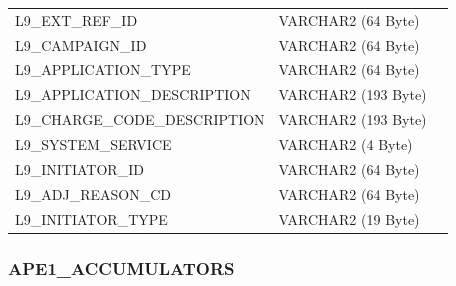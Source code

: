 \documentclass[12pt,twoside]{article}
\begin{document}
\begin{longtable}{lll}
 L9\_EXT\_REF\_ID                        &  VARCHAR2 (64 Byte)   &                            \\
 L9\_CAMPAIGN\_ID                        &  VARCHAR2 (64 Byte)   &                            \\
 L9\_APPLICATION\_TYPE                   &  VARCHAR2 (64 Byte)   &                            \\
 L9\_APPLICATION\_DESCRIPTION            &  VARCHAR2 (193 Byte)  &                            \\
 L9\_CHARGE\_CODE\_DESCRIPTION           &  VARCHAR2 (193 Byte)  &                            \\
 L9\_SYSTEM\_SERVICE                     &  VARCHAR2 (4 Byte)    &                            \\
 L9\_INITIATOR\_ID                       &  VARCHAR2 (64 Byte)   &                            \\
 L9\_ADJ\_REASON\_CD                     &  VARCHAR2 (64 Byte)   &                            \\
 L9\_INITIATOR\_TYPE                     &  VARCHAR2 (19 Byte)   &                            \\
\hline
\end{longtable}

\normalsize
\subsubsection{APE1\_ACCUMULATORS}
\label{sec-8-3-4}
\end{document}
